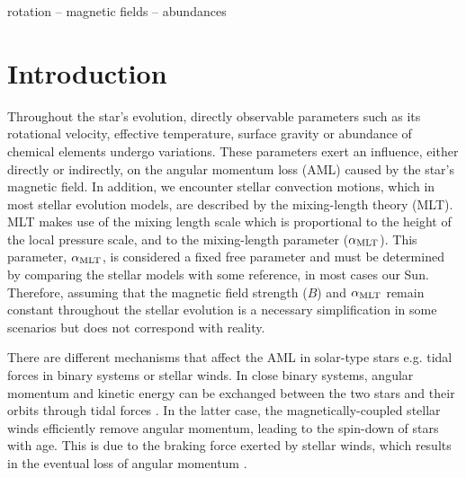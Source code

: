 \documentclass[fleqn,usenatbib]{mnras}
\begin{document}
\begin{keywords}
rotation -- magnetic fields -- abundances
\end{keywords}



\section{Introduction} \label{sec_intro}
Throughout the star's evolution, directly observable parameters such as its rotational velocity, effective temperature, surface gravity or abundance of chemical elements undergo variations. These parameters exert an influence, either directly or indirectly, on the angular momentum loss (AML) caused by the star's magnetic field. In addition, we encounter stellar convection motions, which in most stellar evolution models, are described by the mixing-length theory (MLT). MLT makes use of the mixing length scale which is proportional to the height of the local pressure scale, and to the mixing-length parameter ($\alpha_{\mathrm{MLT}}$). This parameter, $\alpha_{\mathrm{MLT}}$, is considered a fixed free parameter and must be determined by comparing the stellar models with some reference, in most cases our Sun. Therefore, assuming that the magnetic field strength ($B$) and $\alpha_{\mathrm{MLT}}$ remain constant throughout the stellar evolution is a necessary simplification in some scenarios but does not correspond with reality.\par

There are different mechanisms that affect the AML in solar-type stars e.g. tidal forces in binary systems or stellar winds. In close binary systems, angular momentum and kinetic energy can be exchanged between the two stars and their orbits through tidal forces \citep{Li2018}. In the latter case, the magnetically-coupled stellar winds efficiently remove angular momentum,  leading to the spin-down of stars with age. This is due to the braking force exerted by stellar winds, which results in the eventual loss of angular momentum \citep{UdDoula2002}.\par 
\end{document}
